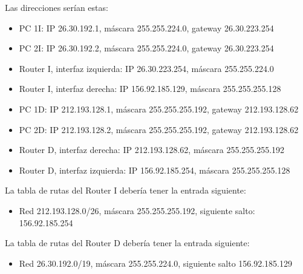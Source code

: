 \documentclass[letterpaper,10pt,spanish]{sphinxmanual}
\begin{document}
\sphinxAtStartPar
Las direcciones serían estas:
\begin{itemize}
\item {} 
\sphinxAtStartPar
PC 1I: IP 26.30.192.1, máscara 255.255.224.0, gateway 26.30.223.254

\item {} 
\sphinxAtStartPar
PC 2I: IP 26.30.192.2, máscara 255.255.224.0, gateway 26.30.223.254

\item {} 
\sphinxAtStartPar
Router I, interfaz izquierda: IP 26.30.223.254, máscara 255.255.224.0

\item {} 
\sphinxAtStartPar
Router I, interfaz derecha: IP 156.92.185.129, máscara 255.255.255.128

\item {} 
\sphinxAtStartPar
PC 1D: IP 212.193.128.1, máscara 255.255.255.192, gateway 212.193.128.62

\item {} 
\sphinxAtStartPar
PC 2D: IP 212.193.128.2, máscara 255.255.255.192, gateway 212.193.128.62

\item {} 
\sphinxAtStartPar
Router D, interfaz derecha: IP 212.193.128.62, máscara 255.255.255.192

\item {} 
\sphinxAtStartPar
Router D, interfaz izquierda: IP 156.92.185.254, máscara 255.255.255.128

\end{itemize}

\sphinxAtStartPar
La tabla de rutas del Router I debería tener la entrada siguiente:
\begin{itemize}
\item {} 
\sphinxAtStartPar
Red 212.193.128.0/26, máscara 255.255.255.192, siguiente salto: 156.92.185.254

\end{itemize}

\sphinxAtStartPar
La tabla de rutas del Router D debería tener la entrada siguiente:
\begin{itemize}
\item {} 
\sphinxAtStartPar
Red 26.30.192.0/19, máscara 255.255.224.0, siguiente salto 156.92.185.129

\end{itemize}
\end{document}
